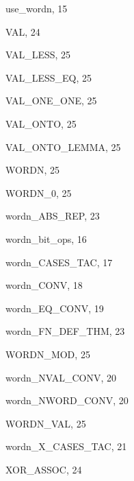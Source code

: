 \begin{theindex}
  \indexspace

  \item {\ptt use\_wordn}, 15

  \indexspace

  \item {\ptt VAL}, 24
  \item {\ptt VAL\_LESS}, 25
  \item {\ptt VAL\_LESS\_EQ}, 25
  \item {\ptt VAL\_ONE\_ONE}, 25
  \item {\ptt VAL\_ONTO}, 25
  \item {\ptt VAL\_ONTO\_LEMMA}, 25

  \indexspace

  \item {\ptt WORDN}, 25
  \item {\ptt WORDN\_0}, 25
  \item {\ptt wordn\_ABS\_REP}, 23
  \item {\ptt wordn\_bit\_ops}, 16
  \item {\ptt wordn\_CASES\_TAC}, 17
  \item {\ptt wordn\_CONV}, 18
  \item {\ptt wordn\_EQ\_CONV}, 19
  \item {\ptt wordn\_FN\_DEF\_THM}, 23
  \item {\ptt WORDN\_MOD}, 25
  \item {\ptt wordn\_NVAL\_CONV}, 20
  \item {\ptt wordn\_NWORD\_CONV}, 20
  \item {\ptt WORDN\_VAL}, 25
  \item {\ptt wordn\_X\_CASES\_TAC}, 21

  \indexspace

  \item {\ptt XOR\_ASSOC}, 24

\end{theindex}
